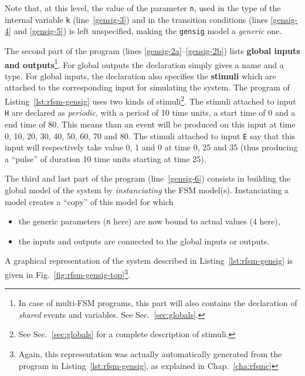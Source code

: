 Note that, at this level, the value of the parameter \verb|n|, used in the type of the internal
variable \verb|k| (line~\ref{gensig-3}) and in the transition conditions (lines \ref{gensig-4} and
\ref{gensig-5}) is left unspecified, making the \verb|gensig| model a \emph{generic} one.

\medskip The second part of the program (lines \ref{gensig-2a}--\ref{gensig-2b}) lists \textbf{global inputs and
  outputs}\footnote{In case of multi-FSM programs, this part will also contains the declaration of
  \emph{shared} events and variables. See Sec.~\ref{sec:globals}.}.  For global outputs the
declaration simply gives a name and a type.  For global inputs, the declaration also specifies the
\textbf{stimuli} which are attached to the corresponding input for simulating the system. The
program of Listing~\ref{lst:rfsm-gensig} uses two kinds of stimuli\footnote{See
  Sec.~\ref{sec:globals} for a complete description of stimuli.}. The stimuli attached to input
\verb|H| are declared as \emph{periodic}, with a period of 10 time units, a start time of 0 and a
end time of 80. This means than an event will be produced on this input at time 0, 10, 20, 30, 40,
50, 60, 70 and 80. The stimuli attached to input \verb|E| say that this input will respectively take
value 0, 1 and 0 at time 0, 25 and 35 (thus producing a ``pulse'' of duration 10 time units starting
at time 25).

\medskip
The third and last part of the program (line~\ref{gensig-6}) consists in building the global model of the system by
\emph{instanciating} the FSM model(s).
Instanciating a model creates a ``copy'' of this model for which
\begin{itemize}
\item the generic parameters (\verb|n| here) are now bound to actual values (4 here),
\item the inputs and outputs are connected to the global inputs or outputs. 
\end{itemize}

\medskip
A graphical representation of the system described in Listing~\ref{lst:rfsm-gensig} is given in
Fig.~\ref{fig:rfsm-gensig-top}\footnote{Again, this representation was actually automatically generated from the
program in Listing~\ref{lst:rfsm-gensig}, as explained in Chap.~\ref{cha:rfsmc}}. 

